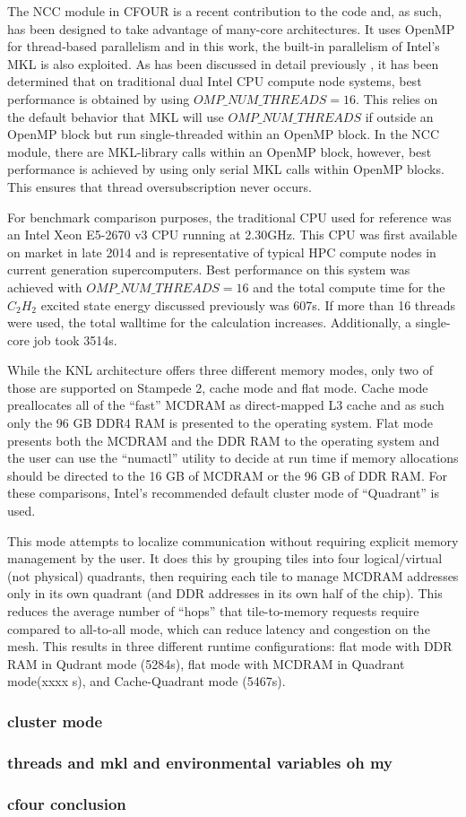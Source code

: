 The NCC module in CFOUR is a recent contribution to the code and, as such, has been designed to take
advantage of many-core architectures. It uses OpenMP for thread-based parallelism and in this work, the
built-in parallelism of Intel's MKL is also exploited. As has been discussed in detail previously \cite{ncc:15},
it has been determined that on traditional dual Intel CPU compute node systems, best performance is obtained 
by using $OMP\_NUM\_THREADS=16$. This relies on the default behavior that MKL will use $OMP\_NUM\_THREADS$ 
if outside an OpenMP block but run single-threaded within an OpenMP block. In the NCC module, there are MKL-library 
calls within an OpenMP block, however, best performance is achieved by using only serial MKL calls within OpenMP
blocks. This ensures that thread oversubscription never occurs.

For benchmark comparison purposes, the traditional CPU used for reference was an Intel Xeon  E5-2670 v3 CPU
running at 2.30GHz. This CPU was first available on market in late 2014 and is representative of typical HPC 
compute nodes in current generation supercomputers. Best performance on this system was achieved with 
$OMP\_NUM\_THREADS=16$ and the total compute time for the $C_2H_2$ excited state energy discussed previously
was 607s. If more than 16 threads were used, the total walltime for the calculation increases. Additionally,
a single-core job took 3514s.

While the KNL architecture offers three different memory modes, only two of those are supported on Stampede 2,
cache mode and flat mode. Cache mode preallocates all of the ``fast'' MCDRAM as direct-mapped L3 cache and
as such only the 96 GB DDR4 RAM is presented to the operating system. Flat mode presents both the MCDRAM and the 
DDR RAM to the operating system and the user can use the ``numactl'' utility to decide at run time if memory 
allocations should be directed to the 16 GB of MCDRAM or the 96 GB of DDR RAM. For these comparisons, Intel's 
recommended default cluster mode of ``Quadrant'' is used. 

This mode attempts to localize communication without requiring explicit memory management by the user. 
It does this by grouping tiles into four logical/virtual (not physical) quadrants, then requiring each tile 
to manage MCDRAM addresses only in its own quadrant (and DDR addresses in its own half of the chip). 
This reduces the average number of ``hops'' that tile-to-memory requests require compared to all-to-all mode, 
which can reduce latency and congestion on the mesh.  This results in three different runtime configurations: 
flat mode with DDR RAM in Qudrant mode (5284s), flat mode with MCDRAM in Quadrant mode(xxxx s), and 
Cache-Quadrant mode (5467s).
\subsubsection{cluster mode}
\subsubsection{threads and mkl and environmental variables oh my}
\subsubsection{cfour conclusion}
